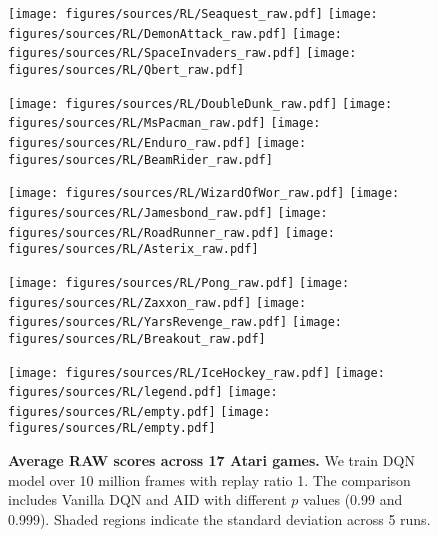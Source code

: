 

\begin{figure*}[h]
    \centering
    \texttt{[image: figures/sources/RL/Seaquest\_raw.pdf]}
    \texttt{[image: figures/sources/RL/DemonAttack\_raw.pdf]}
    \texttt{[image: figures/sources/RL/SpaceInvaders\_raw.pdf]}
    \texttt{[image: figures/sources/RL/Qbert\_raw.pdf]}
    
    \texttt{[image: figures/sources/RL/DoubleDunk\_raw.pdf]}
    \texttt{[image: figures/sources/RL/MsPacman\_raw.pdf]}
    \texttt{[image: figures/sources/RL/Enduro\_raw.pdf]}
    \texttt{[image: figures/sources/RL/BeamRider\_raw.pdf]}
    
    \texttt{[image: figures/sources/RL/WizardOfWor\_raw.pdf]}
    \texttt{[image: figures/sources/RL/Jamesbond\_raw.pdf]}
    \texttt{[image: figures/sources/RL/RoadRunner\_raw.pdf]}
    \texttt{[image: figures/sources/RL/Asterix\_raw.pdf]}
    
    \texttt{[image: figures/sources/RL/Pong\_raw.pdf]}
    \texttt{[image: figures/sources/RL/Zaxxon\_raw.pdf]}
    \texttt{[image: figures/sources/RL/YarsRevenge\_raw.pdf]}
    \texttt{[image: figures/sources/RL/Breakout\_raw.pdf]}
    
    \texttt{[image: figures/sources/RL/IceHockey\_raw.pdf]}
    \texttt{[image: figures/sources/RL/legend.pdf]}
    \texttt{[image: figures/sources/RL/empty.pdf]}
    \texttt{[image: figures/sources/RL/empty.pdf]}
        
    
    \caption{\textbf{Average RAW scores across 17 Atari games.} We train DQN model over 10 million frames with replay ratio 1. The comparison includes Vanilla DQN and AID with different $p$ values (0.99 and 0.999). Shaded regions indicate the standard deviation across 5 runs.}
    
    \label{exp_RL}
\end{figure*}


